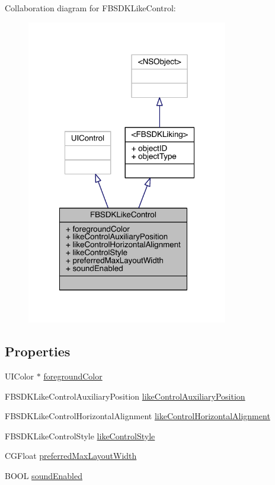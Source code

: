 Collaboration diagram for F\-B\-S\-D\-K\-Like\-Control\-:
\nopagebreak
\begin{figure}[H]
\begin{center}
\leavevmode
\includegraphics[width=249pt]{interface_f_b_s_d_k_like_control__coll__graph}
\end{center}
\end{figure}
\subsection*{Properties}
\begin{DoxyCompactItemize}
\item 
U\-I\-Color $\ast$ \hyperlink{interface_f_b_s_d_k_like_control_a078c28c8d5545d68a6887dc6ce3cd32d}{foreground\-Color}
\item 
F\-B\-S\-D\-K\-Like\-Control\-Auxiliary\-Position \hyperlink{interface_f_b_s_d_k_like_control_a3084afe9f906160458653d82544dd772}{like\-Control\-Auxiliary\-Position}
\item 
F\-B\-S\-D\-K\-Like\-Control\-Horizontal\-Alignment \hyperlink{interface_f_b_s_d_k_like_control_a09b382f7e6805a15fc7eaeaa0ebb8788}{like\-Control\-Horizontal\-Alignment}
\item 
F\-B\-S\-D\-K\-Like\-Control\-Style \hyperlink{interface_f_b_s_d_k_like_control_a4e8264601868efeebbbb247892f95240}{like\-Control\-Style}
\item 
C\-G\-Float \hyperlink{interface_f_b_s_d_k_like_control_a19bcd198e1f6697fa9740c82fbd00de9}{preferred\-Max\-Layout\-Width}
\item 
B\-O\-O\-L \hyperlink{interface_f_b_s_d_k_like_control_af2293652063a0b1e8e3d8ba73b343d1c}{sound\-Enabled}
\end{DoxyCompactItemize}


